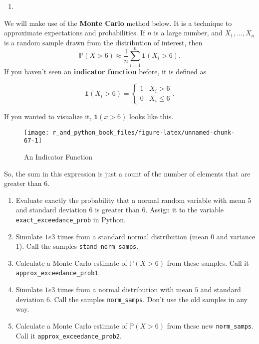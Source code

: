 \documentclass[
  12pt,
  krantz2]{krantz}
\providecommand{\tightlist}{%
  \setlength{\itemsep}{0pt}\setlength{\parskip}{0pt}}
\begin{document}
\begin{enumerate}
\def\labelenumi{\arabic{enumi}.}
\setcounter{enumi}{5}
\tightlist
\item
\end{enumerate}

We will make use of the \textbf{Monte Carlo} method below. It is a technique to approximate expectations and probabilities. If \(n\) is a large number, and \(X_1, \ldots, X_n\) is a random sample drawn from the distribution of interest, then
\begin{equation} 
\mathbb{P}(X > 6) \approx \frac{1}{n}\sum_{i=1}^n \mathbf{1}(X_i > 6).
\end{equation}
If you haven't seen an \textbf{indicator function} before, it is defined as

\begin{equation} 
\mathbf{1}(X_i > 6)
=
\begin{cases}
1 & X_i > 6 \\
0 & X_i \le 6
\end{cases}.
\end{equation}

If you wanted to visualize it, \(\mathbf{1}(x > 6)\) looks like this.

\begin{figure}

{\centering \texttt{[image: r\_and\_python\_book\_files/figure-latex/unnamed-chunk-67-1]} 

}

\caption{An Indicator Function}\label{fig:unnamed-chunk-67}
\end{figure}

So, the sum in this expression is just a count of the number of elements that are greater than \(6\).

\begin{enumerate}
\def\labelenumi{\alph{enumi})}
\item
  Evaluate exactly the probability that a normal random variable with mean \(5\) and standard deviation \(6\) is greater than \(6\). Assign it to the variable \texttt{exact\_exceedance\_prob} in Python.
\item
  Simulate \(1e3\) times from a standard normal distribution (mean 0 and variance 1). Call the samples \texttt{stand\_norm\_samps}.
\item
  Calculate a Monte Carlo estimate of \(\mathbb{P}(X > 6)\) from these samples. Call it \texttt{approx\_exceedance\_prob1}.
\item
  Simulate \(1e3\) times from a normal distribution with mean \(5\) and standard deviation \(6\). Call the samples \texttt{norm\_samps}. Don't use the old samples in any way.
\item
  Calculate a Monte Carlo estimate of \(\mathbb{P}(X > 6)\) from these new \texttt{norm\_samps}. Call it \texttt{approx\_exceedance\_prob2}.
\end{enumerate}
\end{document}
